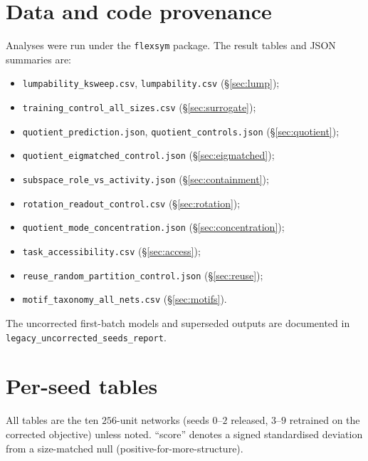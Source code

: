 \documentclass[11pt]{article}
\begin{document}
\section{Data and code provenance}
Analyses were run under the \texttt{flexsym} package. The result tables and JSON summaries are:
\begin{itemize}\itemsep0pt
\item \texttt{lumpability\_ksweep.csv}, \texttt{lumpability.csv} (\S\ref{sec:lump});
\item \texttt{training\_control\_all\_sizes.csv} (\S\ref{sec:surrogate});
\item \texttt{quotient\_prediction.json}, \texttt{quotient\_controls.json} (\S\ref{sec:quotient});
\item \texttt{quotient\_eigmatched\_control.json} (\S\ref{sec:eigmatched});
\item \texttt{subspace\_role\_vs\_activity.json} (\S\ref{sec:containment});
\item \texttt{rotation\_readout\_control.csv} (\S\ref{sec:rotation});
\item \texttt{quotient\_mode\_concentration.json} (\S\ref{sec:concentration});
\item \texttt{task\_accessibility.csv} (\S\ref{sec:access});
\item \texttt{reuse\_random\_partition\_control.json} (\S\ref{sec:reuse});
\item \texttt{motif\_taxonomy\_all\_nets.csv} (\S\ref{sec:motifs}).
\end{itemize}
The uncorrected first-batch models and superseded outputs are documented in
\texttt{legacy\_uncorrected\_seeds\_report}.

\appendix
\section{Per-seed tables}
All tables are the ten $256$-unit networks (seeds $0$--$2$ released, $3$--$9$ retrained on the
corrected objective) unless noted. ``score'' denotes a signed standardised deviation from a
size-matched null (positive-for-more-structure).
\end{document}
